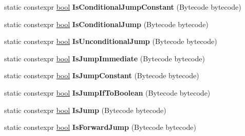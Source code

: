 \begin{DoxyCompactItemize}
static constexpr \mbox{\hyperlink{classbool}{bool}} {\bfseries Is\+Conditional\+Jump\+Constant} (Bytecode bytecode)
\item 
\mbox{\label{classv8_1_1internal_1_1interpreter_1_1Bytecodes_ad5514e1b9c1ed400253bb40f399724b4}} 
static constexpr \mbox{\hyperlink{classbool}{bool}} {\bfseries Is\+Conditional\+Jump} (Bytecode bytecode)
\item 
\mbox{\label{classv8_1_1internal_1_1interpreter_1_1Bytecodes_ae5d21d9c530e0ee3d47f84c5e66f7f92}} 
static constexpr \mbox{\hyperlink{classbool}{bool}} {\bfseries Is\+Unconditional\+Jump} (Bytecode bytecode)
\item 
\mbox{\label{classv8_1_1internal_1_1interpreter_1_1Bytecodes_a4556a6d25e2b7983aecd25a9c1811fd5}} 
static constexpr \mbox{\hyperlink{classbool}{bool}} {\bfseries Is\+Jump\+Immediate} (Bytecode bytecode)
\item 
\mbox{\label{classv8_1_1internal_1_1interpreter_1_1Bytecodes_a94b809f103ac8edd25d211e04890698d}} 
static constexpr \mbox{\hyperlink{classbool}{bool}} {\bfseries Is\+Jump\+Constant} (Bytecode bytecode)
\item 
\mbox{\label{classv8_1_1internal_1_1interpreter_1_1Bytecodes_a0c07c9cd79d0e3974a20a2d988c433ff}} 
static constexpr \mbox{\hyperlink{classbool}{bool}} {\bfseries Is\+Jump\+If\+To\+Boolean} (Bytecode bytecode)
\item 
\mbox{\label{classv8_1_1internal_1_1interpreter_1_1Bytecodes_ae2fd637be535114fb1c4bc42189fbefd}} 
static constexpr \mbox{\hyperlink{classbool}{bool}} {\bfseries Is\+Jump} (Bytecode bytecode)
\item 
\mbox{\label{classv8_1_1internal_1_1interpreter_1_1Bytecodes_a4bdb6ed2795a9aaceb5ae28b8bc58f45}} 
static constexpr \mbox{\hyperlink{classbool}{bool}} {\bfseries Is\+Forward\+Jump} (Bytecode bytecode)
\item 
\mbox{\label{classv8_1_1internal_1_1interpreter_1_1Bytecodes_a60e1beb57e3eaf2f36ce6d1eee4fb87e}} 

\end{DoxyCompactItemize}
